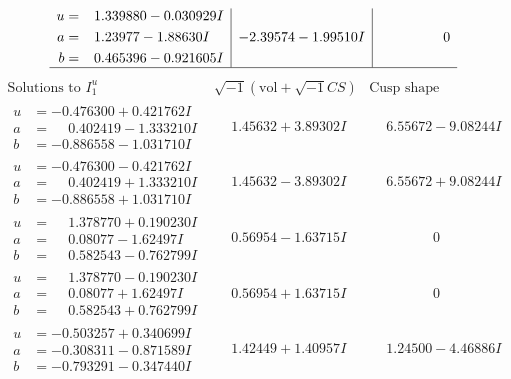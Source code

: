 \documentclass[1p]{elsarticle_modified}
\theoremstyle{definition}
\newcommand{\I}{\sqrt{-1}}
\begin{document}
$$\begin{array}{c|c|c}
\begin{aligned}
u &= \phantom{-}1.339880 - 0.030929 I \\
a &= \phantom{-}1.23977 - 1.88630 I \\
b &= \phantom{-}0.465396 - 0.921605 I\end{aligned}
 & -2.39574 - 1.99510 I & \phantom{-0.000000 } 0\\
 \hline 
 \end{array}$$\newpage$$\begin{array}{c|c|c}  
\text{Solutions to }I^u_{1}& \I (\text{vol} + \sqrt{-1}CS) & \text{Cusp shape}\\
 \hline 
\begin{aligned}
u &= -0.476300 + 0.421762 I \\
a &= \phantom{-}0.402419 - 1.333210 I \\
b &= -0.886558 - 1.031710 I\end{aligned}
 & \phantom{-}1.45632 + 3.89302 I & \phantom{-}6.55672 - 9.08244 I \\ \hline\begin{aligned}
u &= -0.476300 - 0.421762 I \\
a &= \phantom{-}0.402419 + 1.333210 I \\
b &= -0.886558 + 1.031710 I\end{aligned}
 & \phantom{-}1.45632 - 3.89302 I & \phantom{-}6.55672 + 9.08244 I \\ \hline\begin{aligned}
u &= \phantom{-}1.378770 + 0.190230 I \\
a &= \phantom{-}0.08077 - 1.62497 I \\
b &= \phantom{-}0.582543 - 0.762799 I\end{aligned}
 & \phantom{-}0.56954 - 1.63715 I & \phantom{-0.000000 } 0 \\ \hline\begin{aligned}
u &= \phantom{-}1.378770 - 0.190230 I \\
a &= \phantom{-}0.08077 + 1.62497 I \\
b &= \phantom{-}0.582543 + 0.762799 I\end{aligned}
 & \phantom{-}0.56954 + 1.63715 I & \phantom{-0.000000 } 0 \\ \hline\begin{aligned}
u &= -0.503257 + 0.340699 I \\
a &= -0.308311 - 0.871589 I \\
b &= -0.793291 - 0.347440 I\end{aligned}
 & \phantom{-}1.42449 + 1.40957 I & \phantom{-}1.24500 - 4.46886 I \\ \hline\begin{aligned}

\end{aligned}
\end{array}$$
\end{document}
